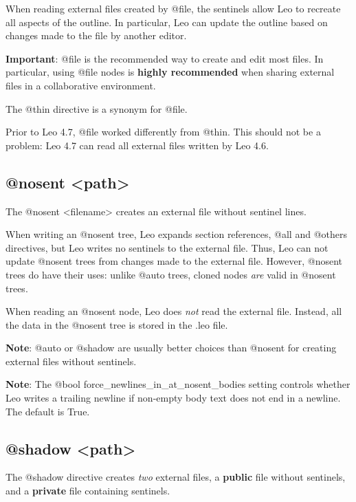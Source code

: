 \documentclass[a4paper,10pt,english]{sphinxmanual}
\begin{document}
When reading external files created by @file, the sentinels allow Leo to
recreate all aspects of the outline. In particular, Leo can update the
outline based on changes made to the file by another editor.

\textbf{Important}: @file is the recommended way to create and edit most files. In
particular, using @file nodes is \textbf{highly recommended} when sharing external
files in a collaborative environment.

The @thin directive is a synonym for @file.

Prior to Leo 4.7, @file worked differently from @thin. This should not be
a problem: Leo 4.7 can read all external files written by Leo 4.6.


\subsection{@nosent \textless{}path\textgreater{}}
\label{directives:nosent-path}
The @nosent \textless{}filename\textgreater{} creates an external file without sentinel lines.

When writing an @nosent tree, Leo expands section references, @all and
@others directives, but Leo writes no sentinels to the external file.
Thus, Leo can not update @nosent trees from changes made to the external
file. However, @nosent trees do have their uses: unlike @auto trees,
cloned nodes \emph{are} valid in @nosent trees.

When reading an @nosent node, Leo does \emph{not} read the external file.
Instead, all the data in the @nosent tree is stored in the .leo file.

\textbf{Note}: @auto or @shadow are usually better choices than @nosent for
creating external files without sentinels.

\textbf{Note}: The @bool force\_newlines\_in\_at\_nosent\_bodies setting controls whether
Leo writes a trailing newline if non-empty body text does not end in a newline.
The default is True.


\subsection{@shadow \textless{}path\textgreater{}}
\label{directives:shadow-path}
The @shadow directive creates \emph{two} external files, a \textbf{public} file without
sentinels, and a \textbf{private} file containing sentinels.
\end{document}
